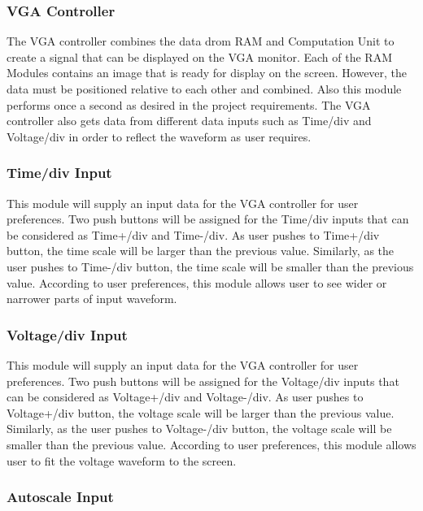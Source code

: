 \documentclass[paper]{IEEEtran}
\begin{document}
\subsubsection{VGA Controller} \- \indent

	The VGA controller combines the data drom RAM and Computation Unit to create a signal that can be displayed on the VGA monitor. Each of the RAM Modules contains an image that is ready for display on the screen. However, the data must be positioned relative to each other and combined. Also this module performs once a second as desired in the project requirements. The VGA controller also gets data from different data inputs such as Time/div and Voltage/div in order to reflect the waveform as user requires.

\subsubsection{Time/div Input} \- \indent
	
	This module will supply an input data for the VGA controller for user preferences. Two push buttons will be assigned for the Time/div inputs that can be considered as Time+/div and Time-/div. As user pushes to Time+/div button, the time scale will be larger than the previous value. Similarly, as the user pushes to Time-/div button, the time scale will be smaller than the previous value. According to user preferences, this module allows user to see wider or narrower parts of input waveform.
	  
\subsubsection{Voltage/div Input} \- \indent

	This module will supply an input data for the VGA controller for user preferences. Two push buttons will be assigned for the Voltage/div inputs that can be considered as Voltage+/div and Voltage-/div. As user pushes to Voltage+/div button, the voltage scale will be larger than the previous value. Similarly, as the user pushes to Voltage-/div button, the voltage scale will be smaller than the previous value. According to user preferences, this module allows user to fit the voltage waveform to the screen.
	
\subsubsection{Autoscale Input} \- \indent
\end{document}
